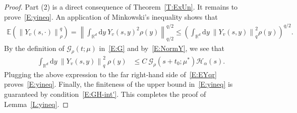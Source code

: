 \documentclass[sn-mathphys]{sn-jnl}%
\renewcommand{\R}{\mathbb{R}}
\newcommand{\E}{\mathbb{E}}
\newcommand{\Norm}[1]{\left\| #1 \right\|}
\newcommand{\ud}{\ensuremath{\mathrm{d}}}
\numberwithin{equation}{section}
\theoremstyle{thmstyleone}%
\theoremstyle{thmstyletwo}%
\theoremstyle{thmstylethree}%
\begin{document}
\begin{proof}
  Part (2) is a direct consequence of Theorem~\ref{T:ExUn}. It remains to prove~\eqref{E:yineq}. An
  application of Minkowski's inequality shows that
  \begin{align}\label{E:EYqr}
    \E\left(\Norm{Y_v(s,\cdot)}_{\rho}^q\right)
    = \Norm{\int_{\R^d} \ud y\: Y_v(s,y)^2\rho(y)}_{q/2}^{q/2}
    \le \left(\int_{\R^d} \ud y\: \Norm{Y_v(s,y)}_q^2\rho(y) \right)^{q/2}.
  \end{align}
  By the definition of $\mathcal{G}_{\rho}(t;\mu)$ in~\eqref{E:G} and by~\eqref{E:NormY}, we see
  that
  \begin{align*}
    \int_{\R^d} \ud y\: \Norm{Y_v(s,y)}_q^2 \: \rho(y)
    & \le C \: \mathcal{G}_{\rho}(s + t_0;\mu^*) \mathcal{H}_\alpha(s).
  \end{align*}
  Plugging the above expression to the far right-hand side of~\eqref{E:EYqr} proves~\eqref{E:yineq}.
  Finally, the finiteness of the upper bound in~\eqref{E:yineq} is guaranteed by
  condition~\eqref{E:GH-int'}. This completes the proof of Lemma~\ref{L:yineq}.
\end{proof}
\end{document}
